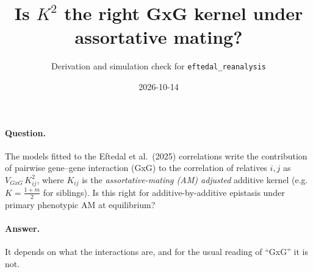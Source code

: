 \documentclass[11pt]{article}
\title{Is $K^2$ the right GxG kernel under assortative mating?}
\author{Derivation and simulation check for \texttt{eftedal\_reanalysis}}
\date{2026-10-14}
\newcommand{\VG}{V_{GxG}}
\begin{document}
\maketitle

\paragraph{Question.}
The models fitted to the Eftedal et al.\ (2025) correlations write the contribution of pairwise gene--gene
interaction (GxG) to the correlation of relatives $i,j$ as $\VG\,K_{ij}^2$, where $K_{ij}$ is the
\emph{assortative-mating (AM) adjusted} additive kernel (e.g.\ $K=\frac{1+m}{2}$ for siblings). Is this
right for additive-by-additive epistasis under primary phenotypic AM at equilibrium?

\paragraph{Answer.}
It depends on what the interactions are, and for the usual reading of ``GxG'' it is not.
\end{document}

